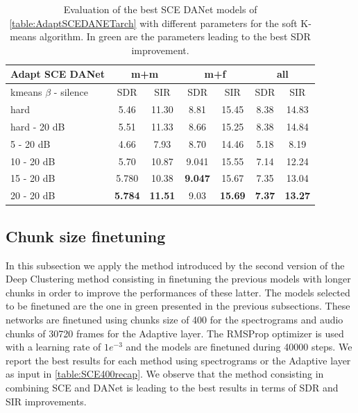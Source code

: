 \documentclass[master, tikz, final,11pt, dvipdfmx]{iscs-thesis}
\begin{document}
\begin{table}[h!]
\centering
\begin{tabular}{l|c|c|c|c|c|c}
Adapt SCE DANet & \multicolumn{2}{c|}{m+m} & \multicolumn{2}{c|}{m+f} & \multicolumn{2}{c}{all} \\ 
\hline 
kmeans $\beta$ - silence & SDR & SIR & SDR & SIR & SDR & SIR \\ 
\hline
hard  & 5.46 & 11.30 & 8.81 & 15.45 & 8.38 & 14.83 \\ 
hard - 20 dB  & 5.51 & 11.33 & 8.66 & 15.25 & 8.38 & 14.84 \\
\hline
\hline
5 - 20 dB  & 4.66 & 7.93 & 8.70 & 14.46 & 5.18 & 8.19 \\ 
10 - 20 dB  & 5.70 & 10.87 & 9.041 & 15.55 & 7.14 & 12.24 \\ 
15 - 20 dB & 5.780 & 10.38 & \cellcolor{green}\textbf{9.047} & \cellcolor{green}15.67 & 7.35 & 13.04 \\ 
20 - 20 dB & \cellcolor{green}\textbf{5.784} & \cellcolor{green}\textbf{11.51} & 9.03 & \textbf{15.69} & \cellcolor{green}\textbf{7.37} & \cellcolor{green}\textbf{13.27} \\ 
\end{tabular}
\caption[Evaluation of the best SCE DANet models using the Adaptive layer for different parameters for the soft K-means algorithm]{Evaluation of the best SCE DANet models of \autoref{table:AdaptSCEDANETarch} with different parameters for the soft K-means algorithm. In green are the parameters leading to the best SDR improvement.}
\label{table:AdaptSCEDANET}
\end{table}

\subsection{Chunk size finetuning}
\label{ext}

In this subsection we apply the method introduced by the second version of the Deep Clustering method consisting in finetuning the previous models with longer chunks in order to improve the performances of these latter. The models selected to be finetuned are the one in green presented in the previous subsections. These networks are finetuned using chunks size of 400 for the spectrograms and audio chunks of 30720 frames for the Adaptive layer. The RMSProp optimizer is used with a learning rate of $1e^{-3}$ and the models are finetuned during 40000 steps. We report the best results for each method using spectrograms or the Adaptive layer as input in \autoref{table:SCE400recap}. We observe that the method consisting in combining SCE and DANet is leading to the best results in terms of SDR and SIR improvements.
\end{document}
